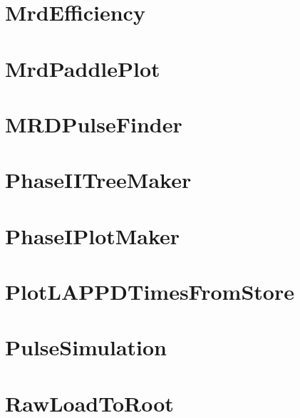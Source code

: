 \documentclass[twoside]{book}
\begin{document}
\chapter{Mrd\-Efficiency}
\label{md_UserTools_MrdEfficiency_README}
\hypertarget{md_UserTools_MrdEfficiency_README}{}

\chapter{Mrd\-Paddle\-Plot}
\label{md_UserTools_MrdPaddlePlot_README}
\hypertarget{md_UserTools_MrdPaddlePlot_README}{}

\chapter{M\-R\-D\-Pulse\-Finder}
\label{md_UserTools_MRDPulseFinder_README}
\hypertarget{md_UserTools_MRDPulseFinder_README}{}

\chapter{Phase\-I\-I\-Tree\-Maker}
\label{md_UserTools_PhaseIITreeMaker_README}
\hypertarget{md_UserTools_PhaseIITreeMaker_README}{}

\chapter{Phase\-I\-Plot\-Maker}
\label{md_UserTools_PhaseITreeMaker_README}
\hypertarget{md_UserTools_PhaseITreeMaker_README}{}

\chapter{Plot\-L\-A\-P\-P\-D\-Times\-From\-Store}
\label{md_UserTools_PlotLAPPDTimesFromStore_README}
\hypertarget{md_UserTools_PlotLAPPDTimesFromStore_README}{}

\chapter{Pulse\-Simulation}
\label{md_UserTools_PulseSimulation_README}
\hypertarget{md_UserTools_PulseSimulation_README}{}

\chapter{Raw\-Load\-To\-Root}
\label{md_UserTools_RawLoadToRoot_README}
\hypertarget{md_UserTools_RawLoadToRoot_README}{}

\end{document}
